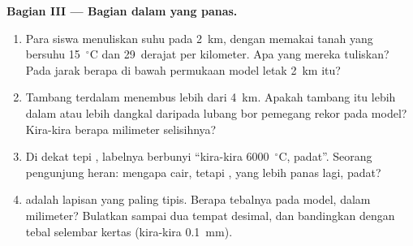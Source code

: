\begin{problem}
\medskip
\noindent\textbf{Bagian III --- Bagian dalam yang panas.}
\begin{enumerate}[resume]
  \item Para siswa menuliskan suhu pada 2~km, dengan memakai tanah yang
        bersuhu 15~$^\circ$C dan 29~derajat per kilometer. Apa yang mereka
        tuliskan? Pada jarak berapa di bawah permukaan model letak 2~km itu?
  \item Tambang terdalam menembus lebih dari 4~km. Apakah tambang itu lebih
        dalam atau lebih dangkal daripada lubang bor pemegang rekor pada
        model? Kira-kira berapa milimeter selisihnya?
  \item Di dekat tepi , labelnya berbunyi ``kira-kira
        6000~$^\circ$C, padat''. Seorang pengunjung heran: mengapa 
        cair, tetapi , yang lebih panas lagi, padat?
  \item {}  adalah lapisan yang paling tipis. Berapa tebalnya pada
        model, dalam milimeter? Bulatkan sampai dua tempat desimal, dan bandingkan dengan tebal selembar kertas (kira-kira
        0.1~mm).
\end{enumerate}
\end{problem}
